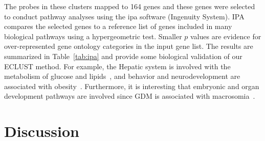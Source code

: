 
The probes in these clusters mapped to 164 genes and these genes were selected to conduct pathway analyses using the \ac{ipa} software (Ingenuity System). IPA compares the selected genes to a reference list of genes included in many biological pathways using a hypergeometric test. Smaller $p$ values are evidence for over-represented gene ontology categories in the input gene list. The results are summarized in Table~\ref{tab:ipa} and provide some biological validation of our ECLUST method. For example, the Hepatic system is involved with the metabolism of glucose and lipids~\citep{saltiel2001insulin}, and behavior and neurodevelopment are associated with obesity~\citep{epstein2004effect}. Furthermore, it is interesting that embryonic and organ development pathways are involved since GDM is associated with macrosomia~\citep{ehrenberg2004influence}. 



\section{Discussion}

